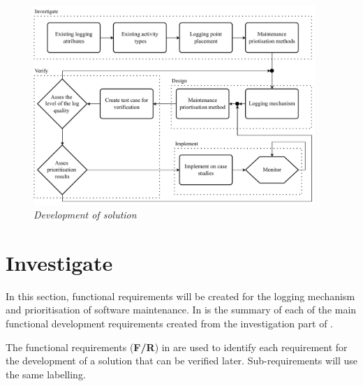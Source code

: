 \clearpage

\begin{figure}[!htb]
	\centering %
	\includegraphics[width=0.95\textwidth]{img/Chapter2/developmentOfSolution/developementOfSolution.pdf}
	\caption[Development of solution]
	{\textit{Development of solution}}\label{fig:ch2_developmentOfSolution}
\end{figure}

\clearpage

\section{Investigate}\label{sec:ch2_investigate}
In this section, functional requirements will be created for the logging mechanism and prioritisation of software maintenance. In  is the summary of each of the main functional development requirements created from the investigation part of .\par The functional requirements (\textbf{F/R}) in  are used to identify each requirement for the development of a solution that can be verified later. Sub-requirements will use the same labelling. 

